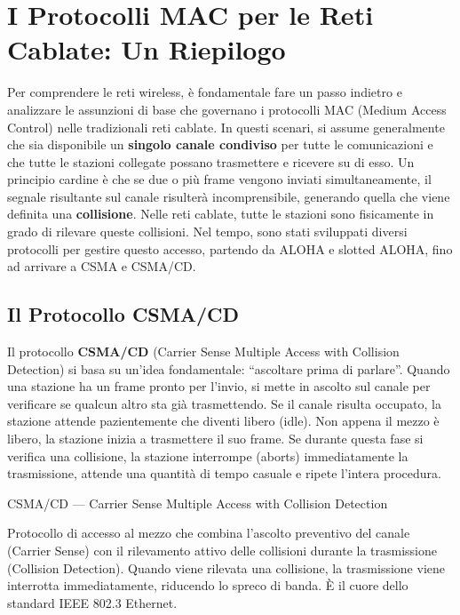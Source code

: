 \documentclass[
  italian,
  openany]{book}
\begin{document}
\section{I Protocolli MAC per le Reti Cablate: Un
Riepilogo}\label{i-protocolli-mac-per-le-reti-cablate-un-riepilogo}

Per comprendere le reti wireless, è fondamentale fare un passo indietro
e analizzare le assunzioni di base che governano i protocolli MAC
(Medium Access Control) nelle tradizionali reti cablate. In questi
scenari, si assume generalmente che sia disponibile un \textbf{singolo
canale condiviso} per tutte le comunicazioni e che tutte le stazioni
collegate possano trasmettere e ricevere su di esso. Un principio
cardine è che se due o più frame vengono inviati simultaneamente, il
segnale risultante sul canale risulterà incomprensibile, generando
quella che viene definita una \textbf{collisione}. Nelle reti cablate,
tutte le stazioni sono fisicamente in grado di rilevare queste
collisioni. Nel tempo, sono stati sviluppati diversi protocolli per
gestire questo accesso, partendo da ALOHA e slotted ALOHA, fino ad
arrivare a CSMA e CSMA/CD.

\subsection{Il Protocollo CSMA/CD}\label{il-protocollo-csmacd}

Il protocollo \textbf{CSMA/CD} (Carrier Sense Multiple Access with
Collision Detection) si basa su un'idea fondamentale: ``ascoltare prima
di parlare''. Quando una stazione ha un frame pronto per l'invio, si
mette in ascolto sul canale per verificare se qualcun altro sta già
trasmettendo. Se il canale risulta occupato, la stazione attende
pazientemente che diventi libero (idle). Non appena il mezzo è libero,
la stazione inizia a trasmettere il suo frame. Se durante questa fase si
verifica una collisione, la stazione interrompe (aborts) immediatamente
la trasmissione, attende una quantità di tempo casuale e ripete l'intera
procedura.

\begin{calloutdefinition}{CSMA/CD — Carrier Sense Multiple Access with Collision Detection}

Protocollo di accesso al mezzo che combina l'ascolto preventivo del
canale (Carrier Sense) con il rilevamento attivo delle collisioni
durante la trasmissione (Collision Detection). Quando viene rilevata una
collisione, la trasmissione viene interrotta immediatamente, riducendo
lo spreco di banda. È il cuore dello standard IEEE 802.3 Ethernet.

\end{calloutdefinition}
\end{document}
